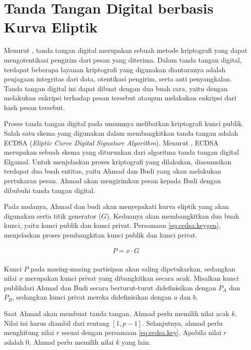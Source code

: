 \section{Tanda Tangan Digital berbasis Kurva Eliptik}
Menurut \textcite{munir2019}, tanda tangan digital merupakan sebuah metode kriptografi yang dapat mengotentikasi pengirim dari pesan yang diterima. Dalam tanda tangan digital, terdapat beberapa layanan kriptografi yang digunakan diantaranya adalah penjagaan integritas dari data, otentikasi pengirim, serta anti penyangkalan. Tanda tangan digital ini dapat dibuat dengan dua buah cara, yaitu dengan melakukan enkripsi terhadap pesan tersebut ataupun melakukan enkripsi dari hash pesan tersebut. 

Proses tanda tangan digital pada umumnya melibatkan kriptografi kunci publik. Salah satu skema yang digunakan dalam membangkitkan tanda tangan adalah ECDSA (\emph{Eliptic Curve Digital Signature Algorithm}). Menurut \textcite{munir2019}, ECDSA merupakan sebuah skema yang diturunkan dari algoritma tanda tangan digital Elgamal. Untuk menjelaskan proses kriptografi yang dilakukan, diasumsikan terdapat dua buah entitas, yaitu Ahmad dan Budi yang akan melakukan pertukaran pesan. Ahmad akan mengirimkan pesan kepada Budi dengan dibubuhi tanda tangan digital.

Pada mulanya, Ahmad dan budi akan menyepakati kurva eliptik yang akan digunakan serta titik generator ($G$). Keduanya akan membangkitkan dua buah kunci, yaitu kunci publik dan kunci privat. Persamaan \ref{eq:ecdsa.keygen}, menjelaskan proses pembangkitan kunci publik dan kunci privat.

\begin{equation}
  \label{eq:ecdsa.keygen}
  \begin{array}{l}   
    P = x \cdot G \\
  \end{array}
\end{equation}

Kunci $P$ pada masing-masing partisipan akan saling dipetukarkan, sedangkan nilai $x$ merupakan kunci privat yang dibangkitkan secara acak. Misalkan kunci publikdari Ahmad dan Budi secara berturut-turut didefinisikan dengan $P_{A}$ dan $P_{B}$, sedangkan kunci privat mereka didefinisikan dengan $a$ dan $b$.

Saat Ahmad akan membuat tanda tangan, Ahmad perlu memilih nilai acak $k$. Nilai ini harus diambil dari rentang $[1, p-1]$. Selanjutnya, ahmad perlu menghitung nilai $r$ sesuai dengan persamaan \ref{eq:ecdsa.key}. Apabila nilai $r$ adalah 0, Ahmad perlu memilih nilai $k$ yang lain.

